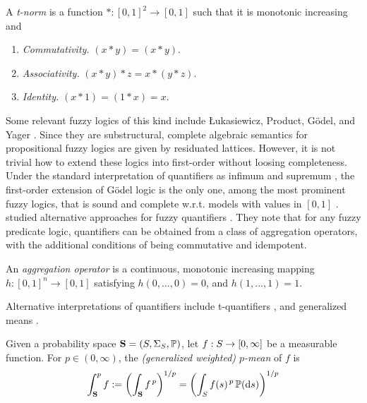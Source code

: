 \begin{definition}
A \textit{t-norm} is a function $ * : [0,1] ^2 \rightarrow [0,1]$ such that it is monotonic increasing and 
\begin{enumerate}
    \item \textit{Commutativity.} $(x * y) = (x * y)$.
    \item \textit{Associativity.} $(x * y) * z = x * (y * z)$.
    \item \textit{Identity.} $(x * 1) = (1 * x) = x$.
\end{enumerate}
\end{definition}

 Some relevant fuzzy logics of this kind include Łukasiewicz, Product, G\"{o}del, and Yager \citep{cintula2011handbook,prooffuzzy}. Since they are substructural, complete algebraic semantics for propositional fuzzy logics are given by residuated lattices. However, it is not trivial how to extend these logics into first-order without loosing completeness. Under the standard interpretation of quantifiers as infimum and supremum \citep{rescher1969many, cintula2011handbook}, the first-order extension of Gödel logic is the only one, among the most prominent fuzzy logics, that is sound and complete w.r.t. models with values in $[0,1]$ \citep{cintula2011handbook}. \citeauthor{LIU19981} studied alternative approaches for fuzzy quantifiers \citep{LIU19981}. They note that for any fuzzy predicate logic, quantifiers can be obtained from a class of aggregation operators, with the additional conditions of being commutative and idempotent.

 \begin{definition}
     An \textit{aggregation operator} is a continuous, monotonic increasing mapping $h : [0,1]^n \rightarrow [0,1]$ satisfying  $h(0,\dots,0) = 0$, and $h(1,...,1)=1$.
 \end{definition}
 
 
Alternative interpretations of quantifiers include t-quantifiers \citep{LIU19981}, and generalized means \citep{badreddine2022logic, slusarz2023logic}. 

 \begin{definition}[$p$-Means]
\label{pmean}
    Given a probability space $\textbf{S} = (S, \sigmal{S}, \mathbb{P})$, let $f : S \rightarrow \PEreal$ be a measurable function. For $p \in (0, \infty)$, the \textit{(generalized weighted) $p$-mean} of $f$ is
    \begin{equation}
        \LMS{f}{p}{\textbf{S}} := \left(\int_{\textbf{S}} f^{\,p}\right)^{1/p} = 
        \left(\int_{S} f(s)^{\,p}\, \mathbb{P}(\de s)\right)^{1/p}
    \end{equation}
\end{definition}


